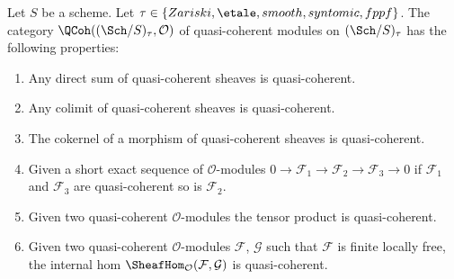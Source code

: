 \begin{lemma}
\label{lemma-properties-quasi-coherent-on-big}
Let $S$ be a scheme.
Let $\tau \in \{Zariski, \linebreak[0] \etale, \linebreak[0]
smooth, \linebreak[0] syntomic, \linebreak[0] fppf\}$.
The category $\QCoh((\Sch/S)_\tau, \mathcal{O})$
of quasi-coherent modules on $(\Sch/S)_\tau$
has the following properties:
\begin{enumerate}
\item Any direct sum of quasi-coherent sheaves is quasi-coherent.
\item Any colimit of quasi-coherent sheaves is quasi-coherent.
\item The cokernel of a morphism of quasi-coherent sheaves
is quasi-coherent.
\item Given a short exact sequence of $\mathcal{O}$-modules
$0 \to \mathcal{F}_1 \to \mathcal{F}_2 \to \mathcal{F}_3 \to 0$
if $\mathcal{F}_1$ and $\mathcal{F}_3$ are quasi-coherent so is
$\mathcal{F}_2$.
\item Given two quasi-coherent $\mathcal{O}$-modules
the tensor product is quasi-coherent.
\item Given two quasi-coherent $\mathcal{O}$-modules
$\mathcal{F}$, $\mathcal{G}$ such that $\mathcal{F}$
is finite locally free, the internal hom
$\SheafHom_\mathcal{O}(\mathcal{F}, \mathcal{G})$
is quasi-coherent.
\end{enumerate}
\end{lemma}


